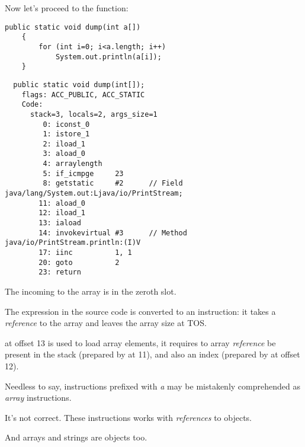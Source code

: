 Now let's proceed to the  function:

\begin{lstlisting}[style=customjava]
	public static void dump(int a[])
	{
		for (int i=0; i<a.length; i++)
			System.out.println(a[i]);
	}
\end{lstlisting}

\begin{lstlisting}
  public static void dump(int[]);
    flags: ACC_PUBLIC, ACC_STATIC
    Code:
      stack=3, locals=2, args_size=1
         0: iconst_0      
         1: istore_1      
         2: iload_1       
         3: aload_0       
         4: arraylength   
         5: if_icmpge     23
         8: getstatic     #2      // Field java/lang/System.out:Ljava/io/PrintStream;
        11: aload_0       
        12: iload_1       
        13: iaload        
        14: invokevirtual #3      // Method java/io/PrintStream.println:(I)V
        17: iinc          1, 1
        20: goto          2
        23: return        
\end{lstlisting}

The incoming  to the array is in the zeroth slot.

The  expression in the source code is converted to an  instruction: 
it takes a \emph{reference} to the array and leaves the array size at \ac{TOS}.

 at offset 13 is used to load array elements, 
it requires to array \emph{reference} be present
in the stack (prepared by  at 11), 
and also an index (prepared by  at offset 12).

Needless to say, instructions prefixed with \emph{a} may be mistakenly comprehended 
as \emph{array} instructions.

It's not correct.
These instructions works with \emph{references} to objects.

And arrays and strings are objects too.

